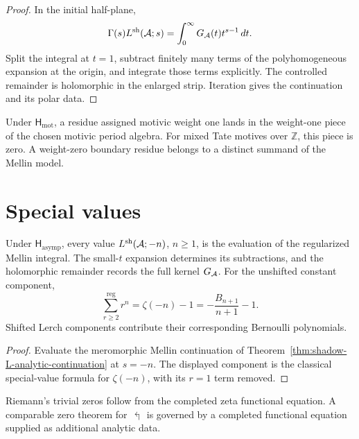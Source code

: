 \begin{proof}
In the initial half-plane,
\[
 \Gamma(s)L^{\mathrm{sh}}(\mathcal A;s)=
 \int_0^\infty G_{\mathcal A}(t)t^{s-1}\,dt.
\]
Split the integral at \(t=1\), subtract finitely many terms of the
polyhomogeneous expansion at the origin, and integrate those terms
explicitly.  The controlled remainder is holomorphic in the enlarged
strip.  Iteration gives the continuation and its polar data.
\end{proof}

\begin{remark}
\label{rem:shL-pole-at-s-1-motivic}
Under \(\mathsf H_{\mathrm{mot}}\), a residue assigned motivic weight
one lands in the weight-one piece of the chosen motivic period algebra.
For mixed Tate motives over \(\mathbb Z\), this piece is zero.  A
weight-zero boundary residue belongs to a distinct summand of the
Mellin model.
\end{remark}

\section{Special values}
\label{sec:shL-trivial-zeros}

\begin{theorem}
\label{thm:trivial-zeros-structure}
\ClaimStatusConditional
Under \(\mathsf H_{\mathrm{asymp}}\), every value
\(L^{\mathrm{sh}}(\mathcal A;-n)\), \(n\ge1\), is the evaluation of the regularized
Mellin integral.  The small-\(t\) expansion determines its
subtractions, and the holomorphic remainder records the full kernel
\(G_{\mathcal A}\).  For the unshifted constant component,
\[
 \sum_{r\ge2}^{\mathrm{reg}}r^n
 =\zeta(-n)-1=-\frac{B_{n+1}}{n+1}-1.
\]
Shifted Lerch components contribute their corresponding Bernoulli
polynomials.
\end{theorem}

\begin{proof}
Evaluate the meromorphic Mellin continuation of
Theorem~\ref{thm:shadow-L-analytic-continuation} at \(s=-n\).  The
displayed component is the classical special-value formula for
\(\zeta(-n)\), with its \(r=1\) term removed.
\end{proof}

\begin{remark}
\label{rem:contrast-with-riemann}
Riemann's trivial zeros follow from the completed zeta functional
equation.  A comparable zero theorem for \(\Lsh\) is governed by a
completed functional equation supplied as additional analytic data.
\end{remark}

